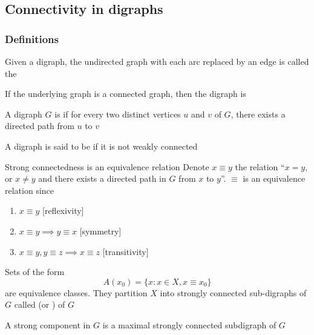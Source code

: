 \documentclass[aspectratio=43]{beamer}
\begin{document}
\subsection{Connectivity in digraphs}
\begin{frame}\frametitle{Definitions}
	\begin{definition}
	Given a digraph, the undirected graph with each arc replaced by an edge is called the 
	\end{definition}
	\vfill
	\begin{definition}
	If the underlying graph is a connected graph, then the digraph is 
	\end{definition}
	\vfill
	\begin{definition}
	A digraph $G$ is  if for every two distinct vertices $u$ and $v$ of $G$, there exists a directed path from $u$ to $v$
	\end{definition}
	\vfill
	\begin{definition}
	A digraph is said to be  if it is not weakly connected
	\end{definition}
\end{frame}

\begin{frame}{Strong connectedness is an equivalence relation}
Denote $x\equiv y$ the relation  ``$x=y$, or $x\neq y$ and there exists a directed path in $G$ from $x$ to $y$''. $\equiv$ is an equivalence relation since
\begin{enumerate}
	\item $x\equiv y$ \hfill[reflexivity]
	\item $x\equiv y\implies y\equiv x$ \hfill[symmetry]
	\item $x\equiv y, y\equiv z\implies x\equiv z$ \hfill[transitivity]
\end{enumerate}
\begin{definition}
	\label{def:strong_components}
	Sets of the form 
	\[
	A(x_0)=\{x:x\in X, x\equiv x_0\}	
	\]
	are equivalence classes. 
	They partition $X$ into strongly connected sub-digraphs of $G$ called  (or ) of $G$
\end{definition}
A strong component in $G$ is a maximal strongly connected subdigraph of $G$
\end{frame}
\end{document}
